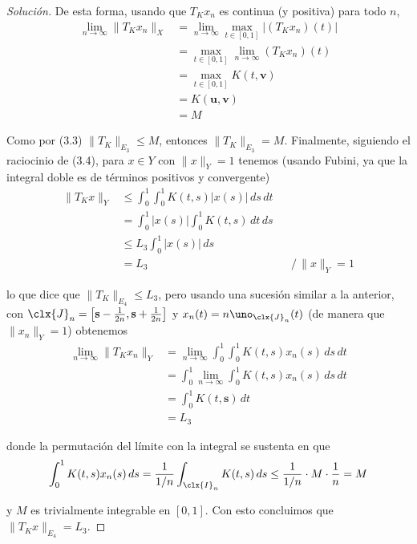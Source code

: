 \documentclass[duedate = 11 de Septiembre, 
			ramo = An\'alisis Funcional, 
			doctype = Tarea 1,
			semester = 2,
			year = 2017]{tarea}
\begin{document}
\begin{enumerate}[(i)]
\begin{proof}[Solución]
	De esta forma, usando que $T_{K}x_{n}$ es continua (y positiva) para todo $n$,
		\begin{align*}
			\lim_{n \to \infty} \|T_{K}x_{n}\|_{X}
				&=	\lim_{n \to \infty} \max_{t \in [0,1]} \left| (T_{K}x_{n})(t) \right|	\\
				&=	\max_{t \in [0,1]} \lim_{n \to \infty} (T_{K}x_{n})(t)	\\
				&=	\max_{t \in [0,1]} K(t,\mathbf{v})	\\
				&=	K(\mathbf{u}, \mathbf{v})	\\
				&=	M
		\end{align*}
	
	Como por (3.3) $\|T_{K}\|_{E_{3}} \leq M$, entonces $\|T_{K}\|_{E_{3}} = M$. Finalmente, siguiendo el raciocinio de (3.4), para $x \in Y$ con $\|x\|_{Y} = 1$ tenemos (usando Fubini, ya que la integral doble es de términos positivos y convergente)
		\[ \begin{aligned}
			\|T_{K}x\|_{Y}
				&\leq	\int_{0}^{1} \int_{0}^{1} K(t,s) |x(s)| \, ds \, dt	\\
				&=	\int_{0}^{1} |x(s)| \int_{0}^{1} K(t,s) \, dt \, ds	\\
				&\leq	L_{3} \int_{0}^{1} |x(s)| \, ds	\\
				&=	L_{3}									&&\big/\, \|x\|_{Y} = 1
		\end{aligned}\]
	
	lo que dice que $\|T_{K}\|_{E_{4}} \leq L_{3}$, pero usando una sucesión similar a la anterior, con $\clx{J}_{n} = \left[\mathbf{s} - \frac{1}{2n}, \mathbf{s} + \frac{1}{2n}\right]$ y $x_{n}(t) = n\uno_{\clx{J}_{n}}(t)$ (de manera que $\|x_{n}\|_{Y} = 1$) obtenemos
		\begin{align*}
			\lim_{n \to \infty} \|T_{K}x_{n}\|_{Y}
				&=	\lim_{n \to \infty} \int_{0}^{1} \int_{0}^{1} K(t,s)x_{n}(s) \, ds \, dt	\\
				&=	\int_{0}^{1}  \lim_{n \to \infty} \int_{0}^{1} K(t,s)x_{n}(s) \, ds \, dt	\\
				&=	\int_{0}^{1} K(t,\mathbf{s}) \, dt	\\
				&=	L_{3}
		\end{align*}
	
	donde la permutación del límite con la integral se sustenta en que
		$$\int_{0}^{1} K(t,s)x_{n}(s) \, ds = \frac{1}{1/n}\int_{\clx{I}_{n}} K(t,s) \, ds \leq \frac{1}{1/n} \cdot M \cdot \frac{1}{n} = M$$
	
	y $M$ es trivialmente integrable en $[0,1]$. Con esto concluimos que $\|T_{K}x\|_{E_{4}} = L_{3}$.
	\end{proof}

\end{enumerate}
\end{document}
